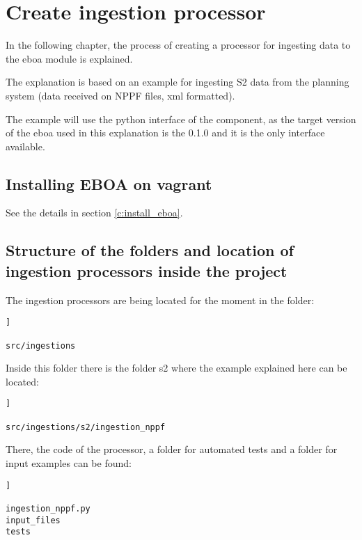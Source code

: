 \chapter{Create ingestion processor}

In the following chapter, the process of creating a processor for ingesting data to the eboa module is explained.

The explanation is based on an example for ingesting S2 data from the planning system (data received on NPPF files, xml formatted).

The example will use the python interface of the component, as the target version of the eboa used in this explanation is the 0.1.0 and it is the only interface available.

\section{Installing EBOA on vagrant}

See the details in section \ref{c:install_eboa}.

\section{Structure of the folders and location of ingestion processors inside the project}

The ingestion processors are being located for the moment in the folder:

\begin{lstlisting}[breaklines=true, style=bash]]

src/ingestions

\end{lstlisting}

Inside this folder there is the folder s2 where the example explained here can be located:

\begin{lstlisting}[breaklines=true, style=bash]]

src/ingestions/s2/ingestion_nppf

\end{lstlisting}

There, the code of the processor, a folder for automated tests and a folder for input examples can be found:

\begin{lstlisting}[breaklines=true, style=bash]]

ingestion_nppf.py
input_files
tests

\end{lstlisting}

